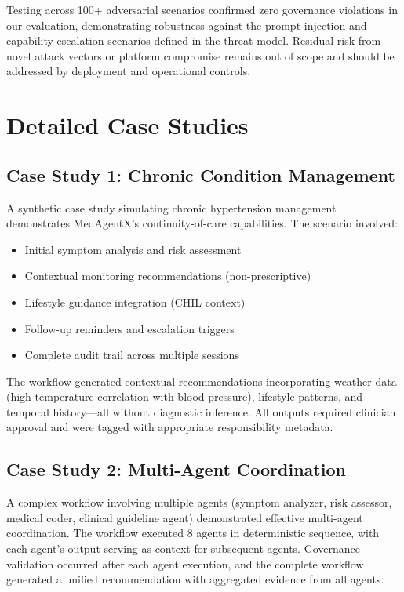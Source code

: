 \documentclass[journal]{IEEEtran}
\begin{document}
Testing across 100+ adversarial scenarios confirmed zero governance violations in our evaluation, demonstrating robustness against the prompt-injection and capability-escalation scenarios defined in the threat model. Residual risk from novel attack vectors or platform compromise remains out of scope and should be addressed by deployment and operational controls.

\newpage
\section{Detailed Case Studies}

\subsection{Case Study 1: Chronic Condition Management}
A synthetic case study simulating chronic hypertension management demonstrates MedAgentX's continuity-of-care capabilities. The scenario involved:

\begin{itemize}
    \item Initial symptom analysis and risk assessment
    \item Contextual monitoring recommendations (non-prescriptive)
    \item Lifestyle guidance integration (CHIL context)
    \item Follow-up reminders and escalation triggers
    \item Complete audit trail across multiple sessions
\end{itemize}

The workflow generated contextual recommendations incorporating weather data (high temperature correlation with blood pressure), lifestyle patterns, and temporal history—all without diagnostic inference. All outputs required clinician approval and were tagged with appropriate responsibility metadata.

\subsection{Case Study 2: Multi-Agent Coordination}
A complex workflow involving multiple agents (symptom analyzer, risk assessor, medical coder, clinical guideline agent) demonstrated effective multi-agent coordination. The workflow executed 8 agents in deterministic sequence, with each agent's output serving as context for subsequent agents. Governance validation occurred after each agent execution, and the complete workflow generated a unified recommendation with aggregated evidence from all agents.
\end{document}
